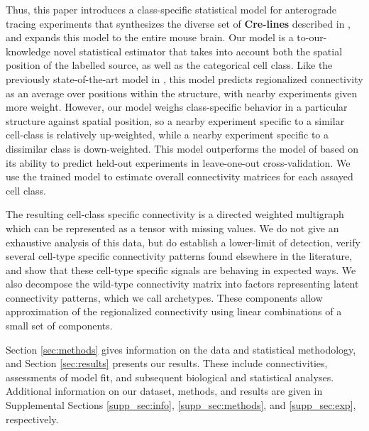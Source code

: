 Thus, this paper introduces a class-specific statistical model for anterograde tracing experiments that synthesizes the diverse set of \textbf{Cre-lines} described in \citet{Harris2019-mr}, and expands this model to the entire mouse brain.
Our model is a to-our-knowledge novel statistical estimator that takes into account both the spatial position of the labelled source, as well as the categorical cell class.
Like the previously state-of-the-art model in \citet{Knox2019-ot}, this model predicts regionalized connectivity as an average over positions within the structure, with nearby experiments given more weight.
However, our model weighs class-specific behavior in a particular structure against spatial position, so a nearby experiment specific to a similar cell-class is relatively up-weighted, while a nearby experiment specific to a dissimilar class is down-weighted.
This model outperforms the model of  \citet{Knox2019-ot} based on its ability to predict held-out experiments in leave-one-out cross-validation.
We use the trained model to estimate overall connectivity matrices for each assayed cell class.

The resulting cell-class specific connectivity is a directed weighted multigraph which can be represented as a tensor with missing values.
We do not give an exhaustive analysis of this data, but do establish a lower-limit of detection, verify several cell-type specific connectivity patterns found elsewhere in the literature, and show that these cell-type specific signals are behaving in expected ways.
We also decompose the wild-type connectivity matrix into factors representing latent connectivity patterns, which we call archetypes.
These components allow approximation of the regionalized connectivity using linear combinations of a small set of components.

Section \ref{sec:methods} gives information on the data and statistical methodology, and Section \ref{sec:results} presents our results.
These include connectivities, assessments of model fit, and subsequent biological and statistical analyses.
Additional information on our dataset, methods, and results are given in Supplemental Sections \ref{supp_sec:info}, \ref{supp_sec:methods}, and \ref{supp_sec:exp}, respectively.